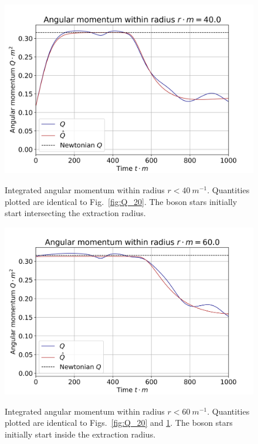 \begin{figure}[h!]
{\includegraphics[width=0.9\columnwidth]{png/Qplot_40.0.png}}
\caption{ Integrated angular momentum within radius $r<40 ~m^{-1}$. Quantities plotted are identical to Fig.~\ref{fig:Q_20}. The boson stars initially start intersecting the extraction radius.  }
\label{fig:Q_40}
\end{figure}

\begin{figure}[h!]
{\includegraphics[width=0.9\columnwidth]{png/Qplot_60.0.png}}
\caption{ Integrated angular momentum within radius $r<60 ~m^{-1}$. Quantities plotted are identical to Figs.~\ref{fig:Q_20} and \ref{fig:Q_40}. The boson stars initially start inside the extraction radius.  }
\label{fig:Q_60}
\end{figure}


